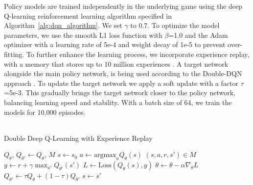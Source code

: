 \begin{flushleft}
\begin{flushleft}
        Policy models are trained independently in the underlying game using the deep Q-learning reinforcement learning algorithm specified in Algorithm~\ref{alg:dqn_algorithm}. We set $\gamma$ to 0.7. To optimize the model parameters, we use the smooth L1 loss function with $\beta$=1.0 and the Adam optimizer with a learning rate of 5e-4 and weight decay of 1e-5 to prevent over-fitting. To further enhance the learning process, we incorporate experience replay, with a memory that stores up to 10 million experiences \cite{10.1007/BF00992699}. A target network alongside the main policy network, is being used according to the Double-DQN approach \cite{vanhasselt2015deep}. To update the target network we apply a soft update with a factor $\tau$=5e-3. This gradually brings the target network closer to the policy network, balancing learning speed and stability. With a batch size of 64, we train the models for 10,000 episodes.\\~\\
        \begin{algorithm}
            \caption{Double Deep Q-Learning with Experience Replay}
            \label{alg:dqn_algorithm}
            \begin{algorithmic}[1]
            \State $Q_\theta$, $Q_{\theta'} \gets Q_\theta$, $M$ 
                \State $s \gets s_{0}$
                    \State $a \gets \text{argmax}_a Q_\theta(s)$ 
                    \State $(s, a, r, s') \in M$ 
                         
                            \State $y \gets r + \gamma \max_{a'} Q_{\theta'}(s')$
                            \State $L \gets \text{Loss}(Q_\theta(s), y)$
                            \State $\theta \gets \theta - \alpha \nabla_\theta L$
                        \EndFor
                    \EndIf
                    \State $Q_{\theta'} \gets \tau Q_\theta + (1 - \tau) Q_{\theta'}$ 
                    \State $s \gets s'$
                \EndFor
            \EndFor
            \end{algorithmic}
        \end{algorithm}
        

\end{flushleft}
\end{flushleft}
